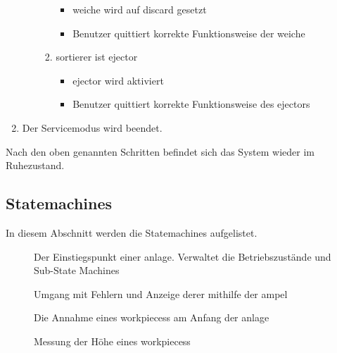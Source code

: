 \begin{enumerate}
\begin{enumerate}
\begin{enumerate}
\begin{itemize}
                \item \gls{weiche} wird auf \gls{discard} gesetzt
                \item Benutzer quittiert korrekte Funktionsweise der \gls{weiche}
            \end{itemize}
            \item \gls{sortierer} ist \gls{ejector}
            \begin{itemize}
                \item \Gls{ejector} wird aktiviert
                \item Benutzer quittiert korrekte Funktionsweise des \gls{ejector}s
            \end{itemize}
        \end{enumerate}
    \end{enumerate}
    \item Der Servicemodus wird beendet.
\end{enumerate}
Nach den oben genannten Schritten befindet sich das System wieder im Ruhezustand.


\subsection{Statemachines}\label{subsec:stm}
In diesem Abschnitt werden die Statemachines aufgelistet.

\begin{figure}
    \caption{Der Einstiegspunkt einer \gls{anlage}.
    Verwaltet die Betriebszustände und Sub-State Machines}
    \label{fig:stm_top_level}
\end{figure}

\begin{figure}
    \caption{Umgang mit Fehlern und Anzeige derer mithilfe der \gls{ampel}}
    \label{fig:stm_error}
\end{figure}

\begin{figure}
    \caption{Die Annahme eines \glspl{workpiece}s am Anfang der \gls{anlage}}
    \label{fig:stm_werkstueck_annahme}
\end{figure}

\begin{figure}
    \caption{Messung der Höhe eines \glspl{workpiece}s}
    \label{fig:stm_hoehe_messen}
\end{figure}

